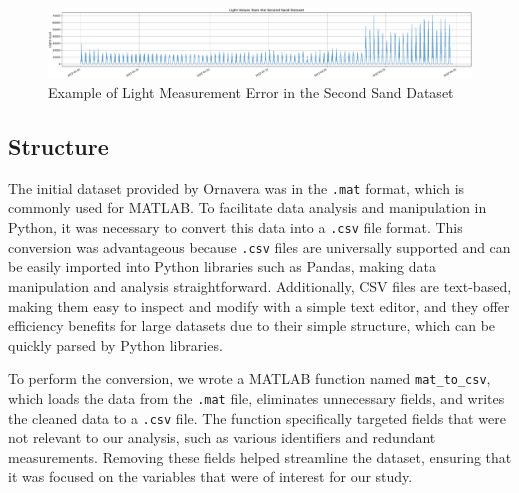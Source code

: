 \begin{figure}[htbp]
    \centering
    \includegraphics[width=15 cm]{5_ChapterDesign/figuras/1_DatasetIssues/Light_Sand_2}
    \caption{Example of Light Measurement Error in the Second Sand Dataset}
    \label{Light_Sand_2}
\end{figure}


\subsection{Structure}

The initial dataset provided by Ornavera was in the \texttt{.mat} format, which is commonly used for MATLAB. To facilitate data analysis and manipulation in Python, it was necessary to convert this data into a \texttt{.csv} file format. This conversion was advantageous because \texttt{.csv} files are universally supported and can be easily imported into Python libraries such as Pandas, making data manipulation and analysis straightforward. Additionally, CSV files are text-based, making them easy to inspect and modify with a simple text editor, and they offer efficiency benefits for large datasets due to their simple structure, which can be quickly parsed by Python libraries.

To perform the conversion, we wrote a MATLAB function named \texttt{mat\_to\_csv}, which loads the data from the \texttt{.mat} file, eliminates unnecessary fields, and writes the cleaned data to a \texttt{.csv} file. The function specifically targeted fields that were not relevant to our analysis, such as various identifiers and redundant measurements. Removing these fields helped streamline the dataset, ensuring that it was focused on the variables that were of interest for our study.

